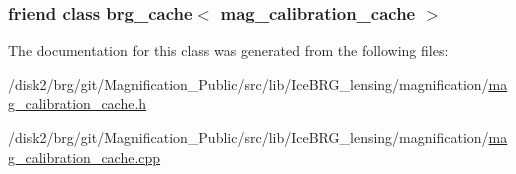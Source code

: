 \subsubsection[{brg\+\_\+cache$<$ mag\+\_\+calibration\+\_\+cache $>$}]{\setlength{\rightskip}{0pt plus 5cm}friend class {\bf brg\+\_\+cache}$<$ {\bf mag\+\_\+calibration\+\_\+cache} $>$\hspace{0.3cm}{\ttfamily [friend]}}\label{classIceBRG_1_1mag__calibration__cache_aee5820d4cd188a3af58576bafc2fc246}


The documentation for this class was generated from the following files\+:\begin{DoxyCompactItemize}
\item 
/disk2/brg/git/\+Magnification\+\_\+\+Public/src/lib/\+Ice\+B\+R\+G\+\_\+lensing/magnification/\hyperlink{mag__calibration__cache_8h}{mag\+\_\+calibration\+\_\+cache.\+h}\item 
/disk2/brg/git/\+Magnification\+\_\+\+Public/src/lib/\+Ice\+B\+R\+G\+\_\+lensing/magnification/\hyperlink{mag__calibration__cache_8cpp}{mag\+\_\+calibration\+\_\+cache.\+cpp}\end{DoxyCompactItemize}
